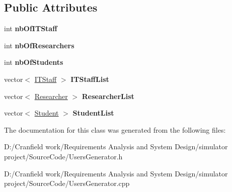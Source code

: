 \subsection*{Public Attributes}
\begin{DoxyCompactItemize}
\item 
\mbox{\label{class_users_generator_a80b10f8dcb7620067a7075ed88ea2a45}} 
int {\bfseries nb\+Of\+I\+T\+Staff}
\item 
\mbox{\label{class_users_generator_a259450d4f3b905f64ba6808c8a7a02f5}} 
int {\bfseries nb\+Of\+Researchers}
\item 
\mbox{\label{class_users_generator_adee64bd85db36bc2843672655c63ae89}} 
int {\bfseries nb\+Of\+Students}
\item 
\mbox{\label{class_users_generator_a4f1465aa85ef7f9df34d53ceb975d0ac}} 
vector$<$ \mbox{\hyperlink{class_i_t_staff}{I\+T\+Staff}} $>$ {\bfseries I\+T\+Staff\+List}
\item 
\mbox{\label{class_users_generator_ad0f9f79843590cfb3cc184d13b978e5f}} 
vector$<$ \mbox{\hyperlink{class_researcher}{Researcher}} $>$ {\bfseries Researcher\+List}
\item 
\mbox{\label{class_users_generator_a57ce948f6af95b98ec2fe3e629988217}} 
vector$<$ \mbox{\hyperlink{class_student}{Student}} $>$ {\bfseries Student\+List}
\end{DoxyCompactItemize}


The documentation for this class was generated from the following files\+:\begin{DoxyCompactItemize}
\item 
D\+:/\+Cranfield work/\+Requirements Analysis and System Design/simulator project/\+Source\+Code/Users\+Generator.\+h\item 
D\+:/\+Cranfield work/\+Requirements Analysis and System Design/simulator project/\+Source\+Code/Users\+Generator.\+cpp\end{DoxyCompactItemize}
